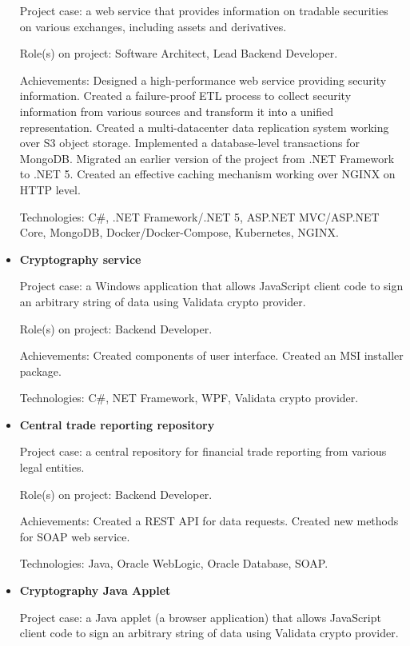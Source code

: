 \documentclass{article}
\begin{document}
\begin{itemize}
{        Project case: a web service that provides information on tradable securities on various exchanges, including assets and derivatives.
        
        Role(s) on project: Software Architect, Lead Backend Developer.
        
        Achievements:
        Designed a high-performance web service providing security information.
        Created a failure-proof ETL process to collect security information from various sources and transform it into a unified representation. 
        Created a multi-datacenter data replication system working over S3 object storage.
        Implemented a database-level transactions for MongoDB.
        Migrated an earlier version of the project from .NET Framework to .NET 5.
        Created an effective caching mechanism working over NGINX on HTTP level.
        
        Technologies: C\#, .NET Framework/.NET 5, ASP.NET MVC/ASP.NET Core, MongoDB,  Docker/Docker-Compose, Kubernetes, NGINX.
    }
    \item {
        \textbf{Cryptography service}
        
        Project case: a Windows application that allows JavaScript client code to sign an arbitrary string of data using Validata crypto provider.
        
        Role(s) on project: Backend Developer.
        
        Achievements:
        Created components of user interface.
        Created an MSI installer package.
        
        Technologies: C\#, NET Framework, WPF, Validata crypto provider.
    }
    \item {
        \textbf{Central trade reporting repository}
        
        Project case: a central repository for financial trade reporting from various legal entities.
        
        Role(s) on project: Backend Developer.
        
        Achievements:
        Created a REST API for data requests.
        Created new methods for SOAP web service.
        
        Technologies: Java, Oracle WebLogic, Oracle Database, SOAP.
    }
    \item {
        \textbf{Cryptography Java Applet}
        
        Project case: a Java applet (a browser application) that allows JavaScript client code to sign an arbitrary string of data using Validata crypto provider.
        
}
\end{itemize}
\end{document}
